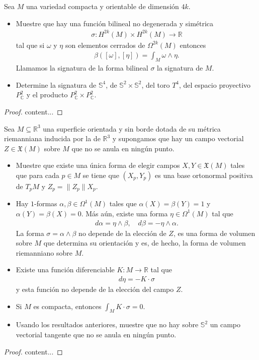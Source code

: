 \documentclass[11pt]{article}
\newcommand{\R}{\mathbb{R}}
\newcommand{\C}{\mathbb{C}}
\newcommand{\Ss}{\mathbb{S}}
\newcommand{\X}{\mathfrak{X}}
\newcommand{\paint}[1]{\color{color}{#1}}
\newenvironment{exercise}[2][Ejercicio]{\begin{trivlist}
\item[\hskip \labelsep \paint{{\bfseries #1}}\hskip \labelsep {\bfseries #2.}]}{\end{trivlist}}
\begin{document}
\begin{exercise}{6} Sea $M$ una variedad compacta y orientable de dimensión $4k$.
\begin{itemize}
\item[(a)] Muestre que hay una función bilineal no degenerada y simétrica
\begin{align*}
\sigma : H^{2k}(M) \times H^{2k}(M) \to \R
\end{align*}
tal que si $\omega$ y $\eta$ son elementos cerrados de $\Omega^{2k}(M)$ entonces 
\begin{align*}
\beta([\omega],[\eta]) = \int_M \omega \wedge \eta.
\end{align*}
Llamamos la signatura de la forma bilineal $\sigma$ la signatura de $M$.
\item[(b)] Determine la signatura de $\Ss^4$, de $\Ss^2 \times \Ss^2$, del toro $T^4$, del espacio proyectivo $P_{\C}^2$ y el producto $P_{\C}^2 \times P_{\C}^2$.
\end{itemize}
\end{exercise}
\begin{proof}
content...
\end{proof}

\begin{exercise}{7} Sea $M \subseteq \R^3$ una superficie orientada y sin borde dotada de su métrica riemanniana inducida por la de $\R^3$ y supongamos que hay un campo vectorial $Z \in \X(M)$ sobre $M$ que no se anula en ningún punto.
\begin{itemize}
\item[(a)] Muestre que existe una única forma de elegir campos $X,Y \in \X(M)$ tales que para cada $p \in M$ se tiene que $(X_p,Y_p)$ es una base ortonormal positiva de $T_pM$ y $Z_p = \|Z_p\|X_p$. 
\item[(b)] Hay $1$-formas $\alpha,\beta\in \Omega^1(M)$ tales que $\alpha(X) = \beta(Y) = 1$ y $\alpha(Y) = \beta(X) = 0$. Más aún, existe una forma $\eta \in \Omega^1(M)$ tal que
\begin{align*}
d\alpha = \eta \wedge \beta, \quad d\beta = -\eta \wedge \alpha.
\end{align*}
La forma $\sigma  = \alpha \wedge \beta$ no depende de la elección de $Z$, es una forma de volumen sobre $M$ que determina su orientación y es, de hecho, la forma de volumen riemanniano sobre $M$.
\item[(c)] Existe una función diferenciable $K : M \to \R$ tal que
\begin{align*}
d\eta = -K \cdot \sigma
\end{align*}
y esta función no depende de la elección del campo $Z$.
\item[(d)] Si $M$ es compacta, entonces $\int_M K \cdot \sigma = 0$.
\item[(e)] Usando los resultados anteriores, muestre que no hay sobre $\Ss^2$ un campo vectorial tangente que no se anula en ningún punto.
\end{itemize}
\end{exercise}
\begin{proof}
content...
\end{proof}
\end{document}
